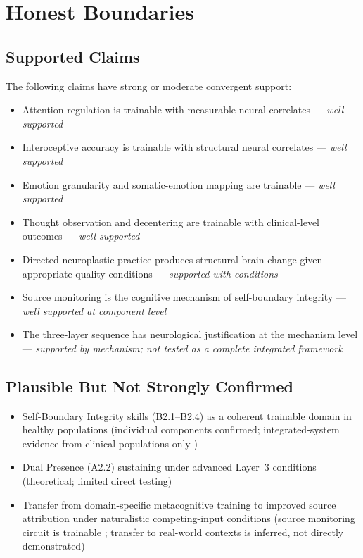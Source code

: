 \documentclass[12pt, a4paper]{article}
\begin{document}
\section{Honest Boundaries}

\subsection{Supported Claims}

The following claims have strong or moderate convergent support:
\begin{itemize}[leftmargin=2em]
\item Attention regulation is trainable with measurable neural correlates \citep{yue2023, ganesan2025} --- \emph{well supported}
\item Interoceptive accuracy is trainable with structural neural correlates \citep{calderone2024} --- \emph{well supported}
\item Emotion granularity and somatic-emotion mapping are trainable \citep{calderone2024, gkintoni2025} --- \emph{well supported}
\item Thought observation and decentering are trainable with clinical-level outcomes \citep{gkintoni2025, ganesan2025} --- \emph{well supported}
\item Directed neuroplastic practice produces structural brain change given appropriate quality conditions \citep{fallon2009, beyeler2017, calderone2024} --- \emph{supported with conditions}
\item Source monitoring is the cognitive mechanism of self-boundary integrity \citep{johnson1993, mitchell2009, simons2008} --- \emph{well supported at component level}
\item The three-layer sequence has neurological justification at the mechanism level --- \emph{supported by mechanism; not tested as a complete integrated framework}
\end{itemize}

\subsection{Plausible But Not Strongly Confirmed}

\begin{itemize}[leftmargin=2em]
\item Self-Boundary Integrity skills (B2.1--B2.4) as a coherent trainable domain in healthy populations (individual components confirmed; integrated-system evidence from clinical populations only \citep{subramaniam2012})
\item Dual Presence (A2.2) sustaining under advanced Layer~3 conditions (theoretical; limited direct testing)
\item Transfer from domain-specific metacognitive training to improved source attribution
under naturalistic competing-input conditions (source monitoring circuit is trainable
\citep{subramaniam2012}; transfer to real-world contexts is inferred, not directly
demonstrated)
\end{itemize}
\end{document}
